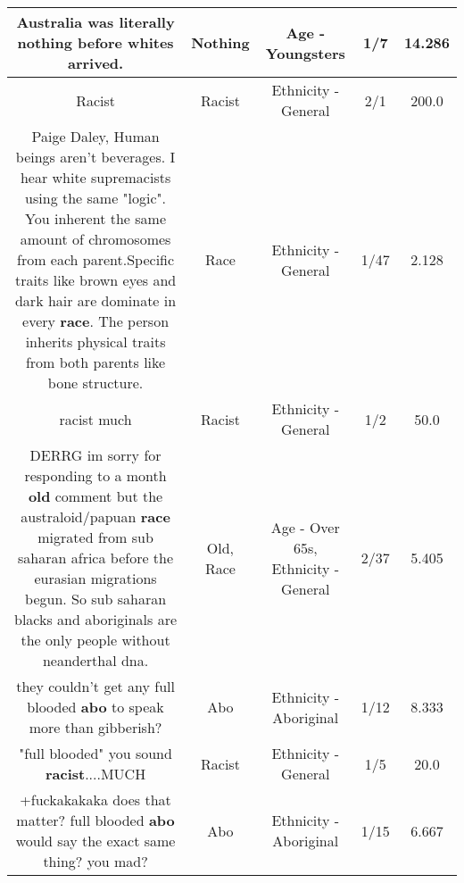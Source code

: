 \documentclass[11pt]{article}
\newlength\mylength
\begin{document}
\begin{center}
\begin{longtable}{|C{.65\mylength}|C{.30\mylength}|C{.12\mylength}|C{.12\mylength}|C{.12\mylength}|}
  \small Australia was literally \textbf{nothing} before whites arrived.\normalsize   & Nothing & Age - Youngsters & 1/7 & 14.286 \\  \hline
  \small Racist\normalsize   & Racist & Ethnicity - General & 2/1 & 200.0 \\  \hline
  \small Paige Daley, Human beings aren't beverages. I hear white supremacists using the same "logic". You inherent the same amount of chromosomes from each parent.Specific traits like brown eyes and dark hair are dominate in every \textbf{race}. The person inherits physical traits  from both parents like bone structure.\normalsize   & Race & Ethnicity - General & 1/47 & 2.128 \\  \hline
  \small racist much\normalsize   & Racist & Ethnicity - General & 1/2 & 50.0 \\  \hline
  \small DERRG im sorry for responding to a month \textbf{old} comment but the australoid/papuan \textbf{race} migrated from sub saharan africa before the eurasian migrations begun. So sub saharan blacks and aboriginals are the only people without neanderthal dna.\normalsize   & Old, Race & Age - Over 65s, Ethnicity - General & 2/37 & 5.405 \\  \hline
  \small they couldn't get any full blooded \textbf{abo} to speak more than gibberish?\normalsize   & Abo & Ethnicity - Aboriginal & 1/12 & 8.333 \\  \hline
  \small "full blooded" you sound \textbf{racist}....MUCH\normalsize   & Racist & Ethnicity - General & 1/5 & 20.0 \\  \hline
  \small +fuckakakaka does that matter? full blooded \textbf{abo} would say the exact same thing? you mad?\normalsize   & Abo & Ethnicity - Aboriginal & 1/15 & 6.667 \\  \hline

\end{longtable}
\end{center}
\end{document}
